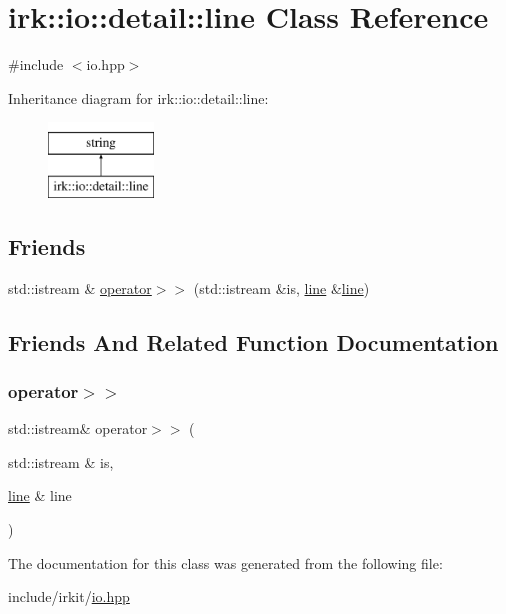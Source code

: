 \hypertarget{classirk_1_1io_1_1detail_1_1line}{}\section{irk\+:\+:io\+:\+:detail\+:\+:line Class Reference}
\label{classirk_1_1io_1_1detail_1_1line}


{\ttfamily \#include $<$io.\+hpp$>$}

Inheritance diagram for irk\+:\+:io\+:\+:detail\+:\+:line\+:\begin{figure}[H]
\begin{center}
\leavevmode
\includegraphics[height=2.000000cm]{classirk_1_1io_1_1detail_1_1line}
\end{center}
\end{figure}
\subsection*{Friends}
\begin{DoxyCompactItemize}
\item 
std\+::istream \& \mbox{\hyperlink{classirk_1_1io_1_1detail_1_1line_adb6d0f2829053d031fd7dbea10e1e562}{operator$>$$>$}} (std\+::istream \&is, \mbox{\hyperlink{classirk_1_1io_1_1detail_1_1line}{line}} \&\mbox{\hyperlink{classirk_1_1io_1_1detail_1_1line}{line}})
\end{DoxyCompactItemize}


\subsection{Friends And Related Function Documentation}
\mbox{\label{classirk_1_1io_1_1detail_1_1line_adb6d0f2829053d031fd7dbea10e1e562}} 
\subsubsection{\texorpdfstring{operator$>$$>$}{operator>>}}
{\footnotesize\ttfamily std\+::istream\& operator$>$$>$ (\begin{DoxyParamCaption}\item[{std\+::istream \&}]{is,  }\item[{\mbox{\hyperlink{classirk_1_1io_1_1detail_1_1line}{line}} \&}]{line }\end{DoxyParamCaption})\hspace{0.3cm}{\ttfamily [friend]}}



The documentation for this class was generated from the following file\+:\begin{DoxyCompactItemize}
\item 
include/irkit/\mbox{\hyperlink{io_8hpp}{io.\+hpp}}\end{DoxyCompactItemize}
